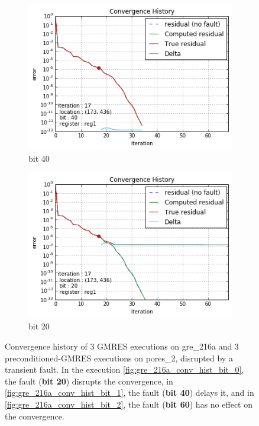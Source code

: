 \begin{figure}[h]
\begin{minipage}[b]{0.48\linewidth}
	\quad
	\begin{subfigure}[t]{\linewidth}
		\centering
		\includegraphics[width=\linewidth]{figures/pores_2/convergence_history_bit_1.png}
		\caption{bit 40}\label{fig:pores_2_conv_hist_bit_1}
	\end{subfigure}
    \quad
    \begin{subfigure}[t]{\linewidth}
		\centering
		\includegraphics[width=\linewidth]{figures/pores_2/convergence_history_bit_2.png}
		\caption{bit 20}\label{fig:pores_2_conv_hist_bit_2}
	\end{subfigure}

    
	\end{minipage}
\caption{Convergence history of 3 GMRES executions on gre_216a and 3 preconditioned-GMRES executions on pores_2, disrupted by a transient fault. In the execution \ref{fig:gre_216a_conv_hist_bit_0}, the fault (\textbf{bit 20}) disrupts the convergence, in \ref{fig:gre_216a_conv_hist_bit_1}, the fault (\textbf{bit 40}) delays it, and in \ref{fig:gre_216a_conv_hist_bit_2}, the fault (\textbf{bit 60}) has no effect on the convergence.}\label{fig:conv_hist_bit}
\end{figure}



